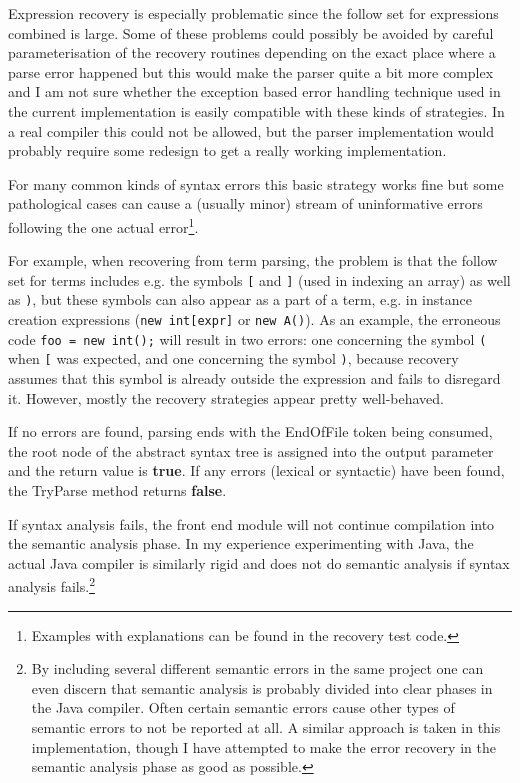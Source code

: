 \documentclass[a4paper,11pt]{article}
\begin{document}
Expression recovery is especially problematic since the follow set for expressions combined is large. Some of these problems could possibly be avoided by careful parameterisation of the recovery routines depending on the exact place where a parse error happened but this would make the parser quite a bit more complex and I am not sure whether the exception based error handling technique used in the current implementation is easily compatible with these kinds of strategies. In a real compiler this could not be allowed, but the parser implementation would probably require some redesign to get a really working implementation.

For many common kinds of syntax errors this basic strategy works fine but some pathological cases can cause a (usually minor) stream of uninformative errors following the one actual error\footnote{Examples with explanations can be found in the recovery test code.}.

For example, when recovering from term parsing, the problem is that the follow set for terms includes e.g. the symbols \verb,[, and \verb,], (used in indexing an array) as well as \verb,),, but these symbols can also appear as a part of a term, e.g. in instance creation expressions (\verb,new int[expr], or \verb,new A(),). As an example, the erroneous code \verb,foo = new int();, will result in two errors: one concerning the symbol \verb,(, when \verb,[, was expected, and one concerning the symbol \verb,),, because recovery assumes that this symbol is already outside the expression and fails to disregard it. However, mostly the recovery strategies appear pretty well-behaved.

If no errors are found, parsing ends with the EndOfFile token being consumed, the root node of the abstract syntax tree is assigned into the output parameter and the return value is \textbf{true}. If any errors (lexical or syntactic) have been found, the TryParse method returns \textbf{false}.

If syntax analysis fails, the front end module will not continue compilation into the semantic analysis phase. In my experience experimenting with Java, the actual Java compiler is similarly rigid and does not do semantic analysis if syntax analysis fails.\footnote{By including several different semantic errors in the same project one can even discern that semantic analysis is probably divided into clear phases in the Java compiler. Often certain semantic errors cause other types of semantic errors to not be reported at all. A similar approach is taken in this implementation, though I have attempted to make the error recovery in the semantic analysis phase as good as possible.}
\end{document}

